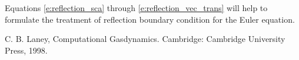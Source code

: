 \documentclass[a4paper,12pt,dvips]{article}
\begin{document}
Equations \ref{e:reflection_sca} through \ref{e:reflection_vec_trans} will help
to formulate the treatment of reflection boundary condition for the Euler
equation.

\begin{thebibliography}{99}
 C. B. Laney, Computational Gasdynamics.
Cambridge: Cambridge University Press, 1998.
\end{thebibliography}
\end{document}
